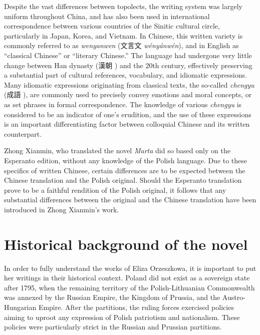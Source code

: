 Despite the vast differences between topolects, the writing system was largely uniform throughout China, and has also been used in international correspondence between various countries of the Sinitic cultural circle, particularly in Japan, Korea, and Vietnam.
In Chinese, this written variety is commonly referred to as \textit{wenyanwen} (文言文 \textit{wényánwén}), and in English as ``classical Chinese'' or ``literary Chinese.''
The language had undergone very little change between Han dynasty (漢朝 ) and the 20th century, effectively preserving a substantial part of cultural references, vocabulary, and idiomatic expressions.
Many idiomatic expressions originating from classical texts, the so-called \textit{chengyu} (成語 ), are commonly used to precisely convey emotions and moral concepts, or as set phrases in formal correspondence.
The knowledge of various \textit{chengyu} is considered to be an indicator of one's erudition, and the use of these expressions is an important differentiating factor between colloquial Chinese and its written counterpart.

Zhong Xianmin, who translated the novel \textit{Marta} did so based only on the Esperanto edition, without any knowledge of the Polish language.
Due to these specifics of written Chinese, certain differences are to be expected between the Chinese translation and the Polish original.
Should the Esperanto translation prove to be a faithful rendition of the Polish original, it follows that any substantial differences between the original and the Chinese translation have been introduced in Zhong Xianmin's work.

\section{Historical background of the novel}

In order to fully understand the works of Eliza Orzeszkowa, it is important to put her writings in their historical context.
Poland did not exist as a sovereign state after 1795, when the remaining territory of the Polish-Lithuanian Commonwealth was annexed by the Russian Empire, the  Kingdom of Prussia, and the Austro-Hungarian Empire.
After the partitions, the ruling forces exercised policies aiming to uproot any expression of Polish patriotism and nationalism. These policies were particularly strict in the Russian and Prussian partitions.

